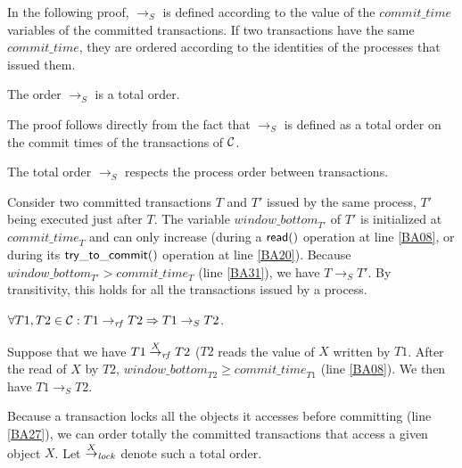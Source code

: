 In the following proof, $\rightarrow_S$ is defined according to the value
of the $\mathit{commit\_time}$ variables of the committed transactions.
If two transactions have the same $\mathit{commit\_time}$, they are ordered 
according to the identities of the processes that issued them.

\begin{lemma}
\label{lemma:total}
The order $\rightarrow_S$ is a total order.
\end{lemma}
\begin{proofL}
 The proof follows directly from the  fact that $\rightarrow_S$ is defined
 as a total order on the commit times of the transactions of ${\cal C}$.
\renewcommand{\toto}{lemma:total}
\end{proofL}


\begin{lemma}
\label{lemma:po}
The  total  order  $\rightarrow_S$   respects  the  process  order  between
transactions. 
\end{lemma}
\begin{proofL}
Consider two committed transactions $T$ and $T'$ issued by the same process, 
$T'$ being executed just after $T$. The variable $\mathit{window\_bottom}_{T'}$
of $T'$ is initialized at $\mathit{commit\_time}_T$ and can only increase
(during a $\sf read()$  operation at line \ref{BA08}, or during 
its $\sf try\_to\_commit()$ operation at line \ref{BA20}).
Because $\mathit{window\_bottom}_{T'} > \mathit{commit\_time}_{T}$ 
(line \ref{BA31}), we have $T \rightarrow_S T'$. By transitivity, 
this holds for all the transactions 
issued by a process.
\renewcommand{\toto}{lemma:po}
\end{proofL}

\begin{lemma}
\label{lemma:read-from}
$\forall T1, T2 \in \mathcal{C}: 
T1 \stackrel{}{\rightarrow}_{\mathit{rf}} T2 \Rightarrow T1 \rightarrow_S T2$.
\end{lemma}
\begin{proofL}
Suppose that we have $T1 \stackrel{X}{\rightarrow}_{\mathit{rf}} T2$ ($T2$ reads the value of $X$ written 
by $T1$.
After the read of $X$ by $T2$, $\mathit{window\_bottom}_{T2} \geq 
\mathit{commit\_time}_{T1}$ (line \ref{BA08}). 
We then have $T1 \rightarrow_S T2$.
\renewcommand{\toto}{lemma:read-from}
\end{proofL}

Because a transaction locks all the objects it accesses before committing 
(line \ref{BA27}),
we can order totally the committed transactions that access a given 
object $X$. Let $\stackrel{X}{\rightarrow}_{\mathit{lock}}$ denote such a  total  order.

